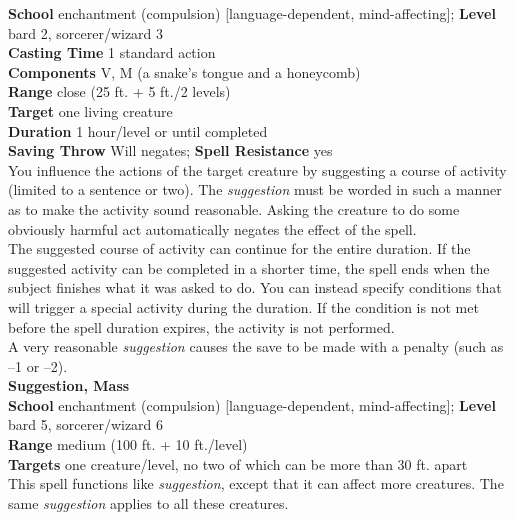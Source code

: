\textbf{School} enchantment (compulsion) [language-dependent, mind-affecting]; \textbf{Level} bard 2, sorcerer/wizard 3\\
\textbf{Casting Time} 1 standard action\\
\textbf{Components} V, M (a snake's tongue and a honeycomb)\\
\textbf{Range} close (25 ft. + 5 ft./2 levels)\\
\textbf{Target} one living creature\\
\textbf{Duration} 1 hour/level or until completed\\
\textbf{Saving Throw }Will negates; \textbf{Spell Resistance} yes\\
You influence the actions of the target creature by suggesting a course of activity (limited to a sentence or two). The \textit{suggestion }must be worded in such a manner as to make the activity sound reasonable. Asking the creature to do some obviously harmful act automatically negates the effect of the spell. \\
The suggested course of activity can continue for the entire duration. If the suggested activity can be completed in a shorter time, the spell ends when the subject finishes what it was asked to do. You can instead specify conditions that will trigger a special activity during the duration. If the condition is not met before the spell duration expires, the activity is not performed.\\
A very reasonable \textit{suggestion }causes the save to be made with a penalty (such as –1 or –2).\\
\textbf{Suggestion, Mass}\\
\textbf{School} enchantment (compulsion) [language-dependent, mind-affecting]; \textbf{Level} bard 5, sorcerer/wizard 6\\
\textbf{Range }medium (100 ft. + 10 ft./level)\\
\textbf{Targets} one creature/level, no two of which can be more than 30 ft. apart\\
This spell functions like \textit{suggestion}, except that it can affect more creatures. The same \textit{suggestion }applies to all these creatures.\\
